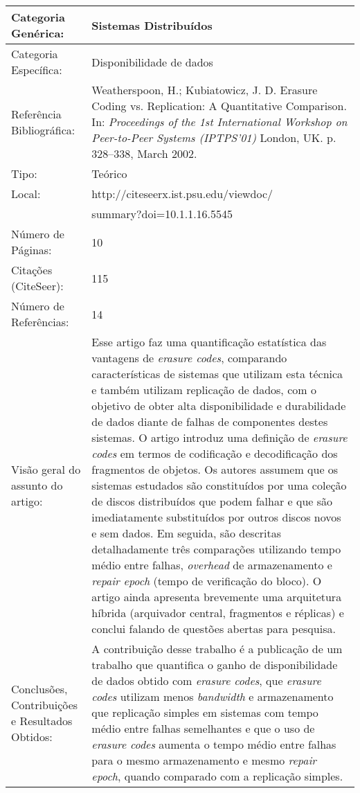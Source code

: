 \documentclass[10pt,a4paper]{article}
\begin{document}
\begin{center}
\begin{tabular}{|p{5cm}||p{10cm}|}
\hline
Categoria Genérica: & Sistemas Distribuídos\\\hline
Categoria Específica: & Disponibilidade de dados\\\hline
Referência Bibliográfica: & Weatherspoon, H.; Kubiatowicz, J. D. Erasure Coding vs. Replication: A Quantitative Comparison. In: \emph{Proceedings of the 1st International Workshop on Peer-to-Peer Systems (IPTPS'01)} London, UK. p. 328--338, March 2002.\\\hline
Tipo: & Teórico\\\hline
Local: & http://citeseerx.ist.psu.edu/viewdoc/\\ & summary?doi=10.1.1.16.5545\\\hline
Número de Páginas: & 10\\\hline
Citações (CiteSeer): & 115\\\hline
Número de Referências: & 14\\\hline
Visão geral do assunto do artigo: & Esse artigo faz uma quantificação estatística das vantagens de \emph{erasure codes}, comparando características de sistemas  que utilizam esta técnica e também utilizam replicação de dados, com o objetivo de obter alta disponibilidade e durabilidade de dados diante de falhas de componentes destes sistemas. O artigo introduz uma definição de \emph{erasure codes} em termos de codificação e decodificação dos fragmentos de objetos. Os autores assumem que os sistemas estudados são constituídos por uma coleção de discos distribuídos que podem falhar e que são imediatamente substituídos por outros discos novos e sem dados.  Em seguida, são descritas detalhadamente três comparações utilizando tempo médio entre falhas, \emph{overhead} de armazenamento e \emph{repair epoch} (tempo de verificação do bloco). O artigo ainda apresenta brevemente uma arquitetura híbrida (arquivador central, fragmentos e réplicas) e conclui falando de questões abertas para pesquisa.\\\hline
Conclusões, Contribuições e Resultados Obtidos: & A contribuição desse trabalho é a publicação de um trabalho que quantifica o ganho de disponibilidade de dados obtido com \emph{erasure codes}, que \emph{erasure codes} utilizam menos \emph{bandwidth} e armazenamento que replicação simples em sistemas com  tempo médio entre falhas semelhantes e que o uso de \emph{erasure codes} aumenta o tempo médio entre falhas para o mesmo armazenamento e mesmo \emph{repair epoch}, quando comparado com a replicação simples.\\\hline

\end{tabular}
\end{center}
\end{document}
